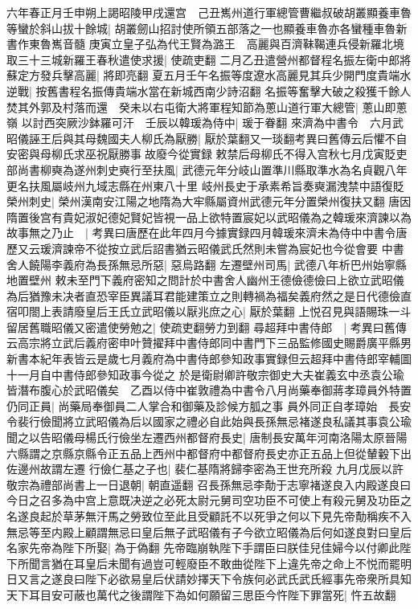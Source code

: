 六年春正月壬申朔上謁昭陵甲戌還宫　己丑嶲州道行軍總管曹繼叔破胡叢顯養車魯等蠻於斜山拔十餘城|{
	胡叢劒山招討使所領五部落之一也顯養車魯亦各蠻種車魯新書作東魯嶲音髓}
庚寅立皇子弘為代王賢為潞王　高麗與百濟靺鞨連兵侵新羅北境取三十三城新羅王春秋遣使求援|{
	使疏吏翻}
二月乙丑遣營州都督程名振左衛中郎將蘇定方發兵擊高麗|{
	將即亮翻}
夏五月壬午名振等度遼水高麗見其兵少開門度貴端水逆戰|{
	按舊書程名振傳貴端水當在新城西南少詩沼翻}
名振等奮擊大破之殺獲千餘人焚其外郭及村落而還　癸未以右屯衛大將軍程知節為蔥山道行軍大總管|{
	蔥山即蔥嶺}
以討西突厥沙鉢羅可汗　壬辰以韓瑗為侍中|{
	瑗于眷翻}
來濟為中書令　六月武昭儀誣王后與其母魏國夫人柳氏為厭勝|{
	厭於葉翻又一琰翻考異曰舊傳云后懼不自安密與母柳氏求巫祝厭勝事故廢今從實録}
敕禁后母柳氏不得入宫秋七月戊寅貶吏部尚書柳奭為遂州刺史奭行至扶風|{
	武德元年分岐山置準川縣取準水為名貞觀八年更名扶風屬岐州九域志縣在州東八十里}
岐州長史于承素希旨奏奭漏洩禁中語復貶榮州刺史|{
	榮州漢南安江陽之地隋為大牢縣屬資州武德元年分置榮州復扶又翻}
唐因隋置後宫有貴妃淑妃德妃賢妃皆視一品上欲特置宸妃以武昭儀為之韓瑗來濟諫以為故事無之乃止　|{
	考異曰唐歷在此年四月今據實録四月韓瑗來濟未為侍中中書令唐歷又云瑗濟諫帝不從按立武后詔書猶云昭儀武氏然則未嘗為宸妃也今從會要}
中書舍人饒陽李義府為長孫無忌所惡|{
	惡烏路翻}
左遷壁州司馬|{
	武德八年析巴州始寧縣地置壁州}
敕未至門下義府密知之問計於中書舍人幽州王德儉德儉曰上欲立武昭儀為后猶豫未决者直恐宰臣異議耳君能建策立之則轉禍為福矣義府然之是日代德儉直宿叩閤上表請廢皇后王氏立武昭儀以厭兆庶之心|{
	厭於葉翻}
上悦召見與語賜珠一斗留居舊職昭儀又密遣使勞勉之|{
	使疏吏翻勞力到翻}
尋超拜中書侍郎　|{
	考異曰舊傳云高宗將立武后義府密申叶贊擢拜中書侍郎同中書門下三品監修國史賜爵廣平縣男新書本紀年表皆云是歲七月義府為中書侍郎參知政事實録但云超拜中書侍郎宰輔圖十一月自中書侍郎參知政事今從之}
於是衛尉卿許敬宗御史大夫崔義玄中丞袁公瑜皆潛布腹心於武昭儀矣　乙酉以侍中崔敦禮為中書令八月尚藥奉御蔣孝璋員外特置仍同正員|{
	尚藥局奉御員二人掌合和御藥及診候方胍之事}
員外同正自孝璋始　長安令裴行儉聞將立武昭儀為后以國家之禮必自此始與長孫無忌褚遂良私議其事袁公瑜聞之以告昭儀母楊氏行儉坐左遷西州都督府長史|{
	唐制長安萬年河南洛陽太原晉陽六縣謂之京縣京縣令正五品上西州中都督府中都督府長史亦正五品上但從輦轂下出佐邊州故謂左遷}
行儉仁基之子也|{
	裴仁基隋將歸李密為王世充所殺}
九月戊辰以許敬宗為禮部尚書上一日退朝|{
	朝直遥翻}
召長孫無忌李勣于志寧褚遂良入内殿遂良曰今日之召多為中宫上意既决逆之必死太尉元舅司空功臣不可使上有殺元舅及功臣之名遂良起於草茅無汗馬之勞致位至此且受顧託不以死爭之何以下見先帝勣稱疾不入無忌等至内殿上顧謂無忌曰皇后無子武昭儀有子今欲立昭儀為后何如遂良對曰皇后名家先帝為陛下所娶|{
	為于偽翻}
先帝臨崩執陛下手謂臣曰朕佳兒佳婦今以付卿此陛下所聞言猶在耳皇后未聞有過豈可輕廢臣不敢曲從陛下上違先帝之命上不悦而罷明日又言之遂良曰陛下必欲易皇后伏請妙擇天下令族何必武氏武氏經事先帝衆所具知天下耳目安可蔽也萬代之後謂陛下為如何願留三思臣今忤陛下罪當死|{
	忤五故翻}
